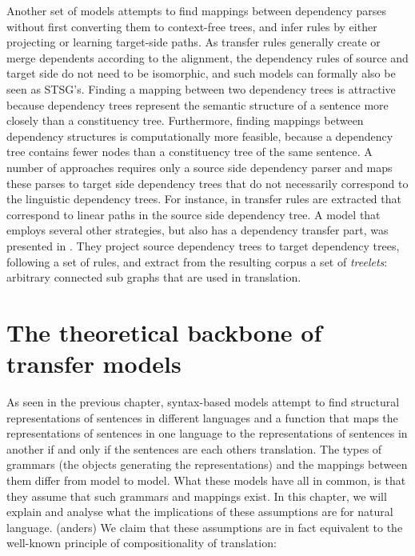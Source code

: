 \documentclass{report}
\theoremstyle{definition}
\theoremstyle{plain}
\begin{document}
Another set of models attempts to find mappings between dependency parses without first converting them to context-free trees, and infer rules by either projecting or learning target-side paths. As transfer rules generally create or merge dependents according to the alignment, the dependency rules of source and target side do not need to be isomorphic, and such models can formally also be seen as STSG's. Finding a mapping between two dependency trees is attractive because dependency trees represent the semantic structure of a sentence more closely than a constituency tree. Furthermore, finding mappings between dependency structures is computationally more feasible, because a dependency tree contains fewer nodes than a constituency tree of the same sentence. A number of approaches requires only a source side dependency parser and maps these parses to target side dependency trees that do not necessarily correspond to the linguistic dependency trees. For instance, in \cite{lin2004path} transfer rules are extracted that correspond to linear paths in the source side dependency tree. A model that employs several other strategies, but also has a dependency transfer part, was presented in \cite{quirk2005dependency,quirk2006dependency,quirk2006we}. They project source dependency trees to target dependency trees, following a set of rules, and extract from the resulting corpus a set of \textit{treelets}: arbitrary connected sub graphs that are used in translation.

\cite{quirk2006dependency}
\cite{menezes2003best}










\chapter{The theoretical backbone of transfer models}





As seen in the previous chapter, syntax-based models attempt to find structural representations of sentences in different languages and a function that maps the representations of sentences in one language to the representations of sentences in another if and only if the sentences are each others translation. The types of grammars (the objects generating the representations) and the mappings between them differ from model to model. What these models have all in common, is that they assume that such grammars and mappings exist. In this chapter, we will explain and analyse what the implications of these assumptions are for natural language. (anders) We claim that these assumptions are in fact equivalent to the well-known principle of compositionality of translation:
\end{document}
